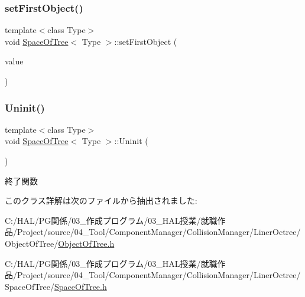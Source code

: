 \subsubsection{\texorpdfstring{set\+First\+Object()}{setFirstObject()}}
{\footnotesize\ttfamily template$<$class Type$>$ \\
void \mbox{\hyperlink{class_space_of_tree}{Space\+Of\+Tree}}$<$ Type $>$\+::set\+First\+Object (\begin{DoxyParamCaption}\item[{\mbox{\hyperlink{class_object_of_tree}{Object\+Of\+Tree}}$<$ Type $>$ $\ast$}]{value }\end{DoxyParamCaption})\hspace{0.3cm}{\ttfamily [inline]}}

\mbox{\label{class_space_of_tree_a8f7238becd1df9192e5f5ddc442b7ee3}} 
\subsubsection{\texorpdfstring{Uninit()}{Uninit()}}
{\footnotesize\ttfamily template$<$class Type$>$ \\
void \mbox{\hyperlink{class_space_of_tree}{Space\+Of\+Tree}}$<$ Type $>$\+::Uninit (\begin{DoxyParamCaption}{ }\end{DoxyParamCaption})\hspace{0.3cm}{\ttfamily [inline]}}



終了関数 



このクラス詳解は次のファイルから抽出されました\+:\begin{DoxyCompactItemize}
\item 
C\+:/\+H\+A\+L/\+P\+G関係/03\+\_\+作成プログラム/03\+\_\+\+H\+A\+L授業/就職作品/\+Project/source/04\+\_\+\+Tool/\+Component\+Manager/\+Collision\+Manager/\+Liner\+Octree/\+Object\+Of\+Tree/\mbox{\hyperlink{_object_of_tree_8h}{Object\+Of\+Tree.\+h}}\item 
C\+:/\+H\+A\+L/\+P\+G関係/03\+\_\+作成プログラム/03\+\_\+\+H\+A\+L授業/就職作品/\+Project/source/04\+\_\+\+Tool/\+Component\+Manager/\+Collision\+Manager/\+Liner\+Octree/\+Space\+Of\+Tree/\mbox{\hyperlink{_space_of_tree_8h}{Space\+Of\+Tree.\+h}}\end{DoxyCompactItemize}
